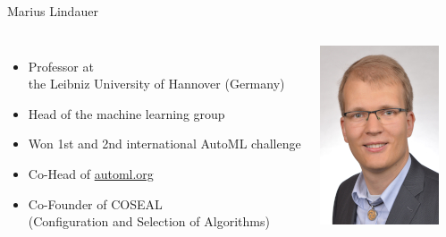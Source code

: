 \begin{frame}[c]{Marius Lindauer}



\begin{columns}
	
	
	\begin{itemize}
		\item Professor at\\ the Leibniz University of Hannover (Germany)
		\item Head of the machine learning group
		\item Won 1st and 2nd international AutoML challenge
		\item Co-Head of \url{automl.org}
		\item Co-Founder of COSEAL\\ (Configuration and Selection of Algorithms)
	\end{itemize}
	
	
	\includegraphics[width=1.0\textwidth]{images/lindauer.jpg}
	
\end{columns}


\end{frame}


